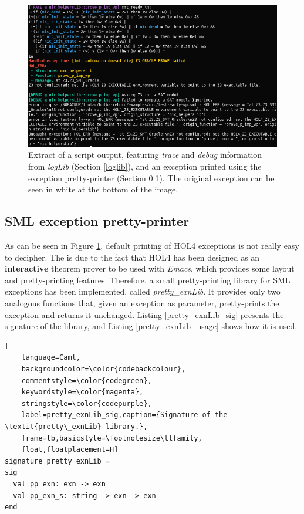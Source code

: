 \documentclass{kththesis}
\begin{document}
{\begin{figure}[t]
	\includegraphics[width=\textwidth]{figures/loglib-ppexn-ppterm.png}
	\centering
	\caption{Extract of a script output, featuring \textit{trace} and \textit{debug} information from \textit{logLib} (Section \ref{loglib}), and an exception printed using the exception pretty-printer (Section \ref{pp_exn}). The original exception can be seen in white at the bottom of the image.}
	\label{loglib-ppexn-ppterm}
\end{figure}

\subsection{SML exception pretty-printer} \label{pp_exn}

As can be seen in Figure \ref{loglib-ppexn-ppterm}, default printing of HOL4 exceptions is not really easy to decipher. The is due to the fact that HOL4 has been designed as an \textbf{interactive} theorem prover to be used with \textit{Emacs}, which provides some layout and pretty-printing features. Therefore, a small pretty-printing library for SML exceptions has been implemented, called \textit{pretty\_exnLib}. It provides only two analogous functions that, given an exception as parameter, pretty-prints the exception and returns it unchanged. Listing \ref{pretty_exnLib_sig} presents the signature of the library, and Listing \ref{pretty_exnLib_usage} shows how it is used.

\begin{lstlisting}[
    language=Caml,
    backgroundcolor=\color{codebackcolour},
    commentstyle=\color{codegreen},
    keywordstyle=\color{magenta},
    stringstyle=\color{codepurple},
    label=pretty_exnLib_sig,caption={Signature of the \textit{pretty\_exnLib} library.},
    frame=tb,basicstyle=\footnotesize\ttfamily,
    float,floatplacement=H]
signature pretty_exnLib =
sig
  val pp_exn: exn -> exn
  val pp_exn_s: string -> exn -> exn
end
\end{lstlisting}


}
\end{document}
